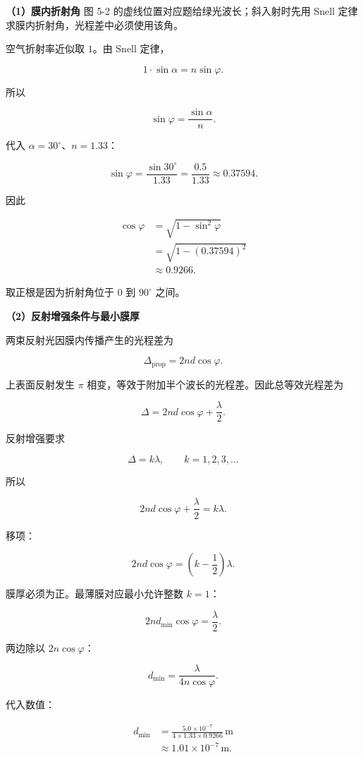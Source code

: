 \documentclass[12pt,a4paper,UTF8]{ctexart}
\begin{document}
\textbf{（1）膜内折射角} 图 5-2 的虚线位置对应题给绿光波长；斜入射时先用
Snell 定律求膜内折射角，光程差中必须使用该角。

空气折射率近似取 \(1\)。由 Snell 定律，

\[1\cdot\sin\alpha=n\sin\varphi.\]

所以

\[\sin\varphi=\frac{\sin\alpha}{n}.\]

代入 \(\alpha=30^\circ\)、\(n=1.33\)：

\[\sin\varphi
=\frac{\sin30^\circ}{1.33}
=\frac{0.5}{1.33}
\approx0.37594.\]

因此

\[\begin{aligned}
\cos\varphi
&=\sqrt{1-\sin^2\varphi}\\
&=\sqrt{1-(0.37594)^2}\\
&\approx0.9266.
\end{aligned}\]

取正根是因为折射角位于 \(0\) 到 \(90^\circ\) 之间。

\textbf{（2）反射增强条件与最小膜厚}

两束反射光因膜内传播产生的光程差为

\[\Delta_{\mathrm{prop}}=2nd\cos\varphi.\]

上表面反射发生 \(\pi\)
相变，等效于附加半个波长的光程差。因此总等效光程差为

\[\Delta=2nd\cos\varphi+\frac{\lambda}{2}.\]

反射增强要求

\[\Delta=k\lambda,\qquad k=1,2,3,\ldots\]

所以

\[2nd\cos\varphi+\frac{\lambda}{2}=k\lambda.\]

移项：

\[2nd\cos\varphi
=\left(k-\frac12\right)\lambda.\]

膜厚必须为正。最薄膜对应最小允许整数 \(k=1\)：

\[2nd_{\min}\cos\varphi=\frac{\lambda}{2}.\]

两边除以 \(2n\cos\varphi\)：

\[\boxed{
d_{\min}=\frac{\lambda}{4n\cos\varphi}
}.\]

代入数值：

\[\begin{aligned}
d_{\min}
&=\frac{5.0\times10^{-7}}
{4\times1.33\times0.9266}\,\mathrm m\\
&\approx1.01\times10^{-7}\,\mathrm m.
\end{aligned}\]
\end{document}
